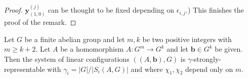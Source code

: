 \begin {proof}
$\mathbf {y}^{(j)}_{(1,0)}$ can be thought to be fixed depending on $\epsilon _{i,j}$.) This finishes the proof of the remark.
 \end {proof} 
 
 \begin {proposition} 
  \label {p.repr_hom} Let $G$ be a finite abelian group and let $m,k$ be two positive integers with $m\geq k+2$. Let $A$ be a homomorphism $A:G^m\to G^k$ and let $\mathbf {b}\in G^k$ be given. Then the system of linear configurations $((A,\mathbf {b}),G)$ is $\gamma $-strongly-representable with $\gamma _i=|G|/|S_i(A,G)|$ and where $\chi _1,\chi _2$ depend only on $m$.
 \end {proposition} 
 

